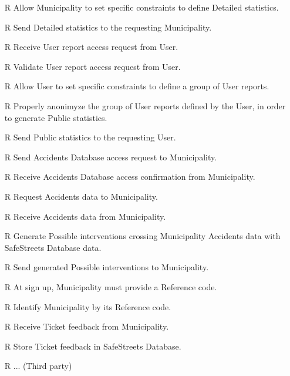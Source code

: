 \documentclass[../../../rasd.tex]{subfiles}
\begin{document}
\begin{itemize}
	\item[R\subs{}]Allow Municipality to set specific constraints to define Detailed statistics.
	\item[R\subs{}]Send Detailed statistics to the requesting Municipality.
	\item[R\subs{}]Receive User report access request from User.
	\item[R\subs{}]Validate User report access request from User.
	\item[R\subs{}]Allow User to set specific constraints to define a group of User reports.
	\item[R\subs{}]Properly anonimyze the group of User reports defined by the User, in order to generate Public statistics.
	\item[R\subs{}]Send Public statistics to the requesting User.
	\item[R\subs{}]Send Accidents Database access request to Municipality. 
	\item[R\subs{}]Receive Accidents Database access confirmation from Municipality.
	\item[R\subs{}]Request Accidents data to Municipality.
	\item[R\subs{}]Receive Accidents data from Municipality.
	\item[R\subs{}]Generate Possible interventions crossing Municipality Accidents data with SafeStreets Database data.
	\item[R\subs{}]Send generated Possible interventions to Municipality.
	\item[R\subs{}]At sign up, Municipality must provide a Reference code.
	\item[R\subs{}]Identify Municipality by its Reference code.
	\item[R\subs{}]Receive Ticket feedback from Municipality.
	\item[R\subs{}]Store Ticket feedback in SafeStreets Database.
	\item[R\subs{}]... (Third party)
\end{itemize}
\end{document}
